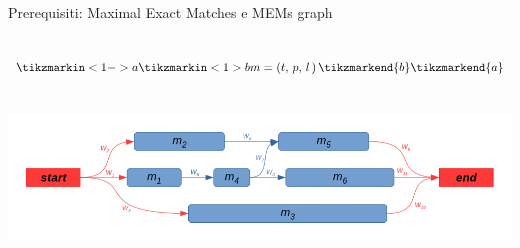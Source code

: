 \documentclass{beamer}
\begin{document}
\begin{tframe}{Prerequisiti: Maximal Exact Matches e MEMs graph}
  
  \begin{columns}
     \[\tikzmarkin<1->{a}\tikzmarkin<1>{b}
    m=(t,\,p,\,l\,)\,
    \tikzmarkend{b}\tikzmarkend{a}\]

    \includegraphics[scale = 0.65]{img/mem.jpg}

  \end{columns}
  \includegraphics[scale = 0.315]{img/memg.png}

\end{tframe}
\end{document}
